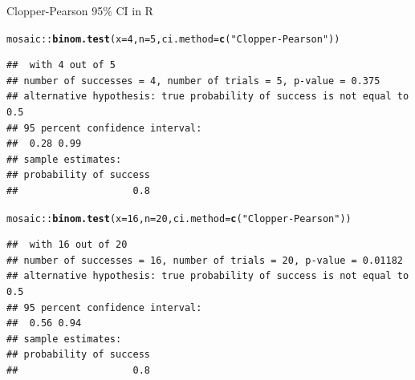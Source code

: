 \documentclass[10pt,handout]{beamer}\usepackage[]{graphicx}\usepackage[]{color}
\makeatletter
\newcommand{\hlnum}[1]{\textcolor[rgb]{0.686,0.059,0.569}{#1}}%
\newcommand{\hlstr}[1]{\textcolor[rgb]{0.192,0.494,0.8}{#1}}%
\newcommand{\hlopt}[1]{\textcolor[rgb]{0,0,0}{#1}}%
\newcommand{\hlstd}[1]{\textcolor[rgb]{0.345,0.345,0.345}{#1}}%
\newcommand{\hlkwc}[1]{\textcolor[rgb]{0.333,0.667,0.333}{#1}}%
\newcommand{\hlkwd}[1]{\textcolor[rgb]{0.737,0.353,0.396}{\textbf{#1}}}%
\newenvironment{kframe}{%
 \def\at@end@of@kframe{}%
 \ifinner\ifhmode%
  \def\at@end@of@kframe{\end{minipage}}%
  \begin{minipage}{\columnwidth}%
 \fi\fi%
 \def\FrameCommand##1{\hskip\@totalleftmargin \hskip-\fboxsep
 \colorbox{shadecolor}{##1}\hskip-\fboxsep
     \hskip-\linewidth \hskip-\@totalleftmargin \hskip\columnwidth}%
 \MakeFramed {\advance\hsize-\width
   \@totalleftmargin\z@ \linewidth\hsize
   \@setminipage}}%
 {\par\unskip\endMakeFramed%
 \at@end@of@kframe}
\newenvironment{knitrout}{}{} %
\makeatother
\begin{document}
\begin{frame}[fragile]{Clopper-Pearson 95\% CI in R}
\begin{knitrout}\tiny
{}\color{fgcolor}\begin{kframe}
\begin{alltt}
\hlstd{mosaic}\hlopt{::}\hlkwd{binom.test}\hlstd{(}\hlkwc{x}\hlstd{=}\hlnum{4}\hlstd{,} \hlkwc{n}\hlstd{=}\hlnum{5}\hlstd{,} \hlkwc{ci.method}\hlstd{=}\hlkwd{c}\hlstd{(}\hlstr{"Clopper-Pearson"}\hlstd{))}
\end{alltt}
\begin{verbatim}
##  with 4 out of 5 
## number of successes = 4, number of trials = 5, p-value = 0.375
## alternative hypothesis: true probability of success is not equal to 0.5 
## 95 percent confidence interval:
##  0.28 0.99 
## sample estimates:
## probability of success 
##                    0.8
\end{verbatim}
\begin{alltt}
\hlstd{mosaic}\hlopt{::}\hlkwd{binom.test}\hlstd{(}\hlkwc{x}\hlstd{=}\hlnum{16}\hlstd{,} \hlkwc{n}\hlstd{=}\hlnum{20}\hlstd{,} \hlkwc{ci.method}\hlstd{=}\hlkwd{c}\hlstd{(}\hlstr{"Clopper-Pearson"}\hlstd{))}
\end{alltt}
\begin{verbatim}
##  with 16 out of 20 
## number of successes = 16, number of trials = 20, p-value = 0.01182
## alternative hypothesis: true probability of success is not equal to 0.5 
## 95 percent confidence interval:
##  0.56 0.94 
## sample estimates:
## probability of success 
##                    0.8
\end{verbatim}
\end{kframe}
\end{knitrout}
\end{frame}
\end{document}
